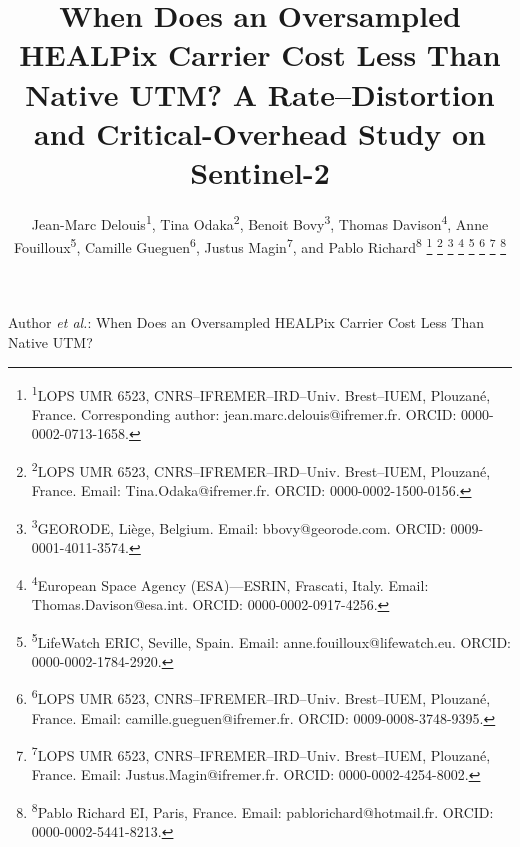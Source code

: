 \documentclass[journal]{IEEEtran}
\begin{document}

\title{When Does an Oversampled HEALPix Carrier Cost Less Than Native UTM? A Rate--Distortion and Critical-Overhead Study on Sentinel-2}

\author{
Jean-Marc Delouis\textsuperscript{1},
Tina Odaka\textsuperscript{2},
Benoit Bovy\textsuperscript{3},
Thomas Davison\textsuperscript{4},
Anne Fouilloux\textsuperscript{5},
Camille Gueguen\textsuperscript{6},
Justus Magin\textsuperscript{7},
and Pablo Richard\textsuperscript{8}%
\thanks{\textsuperscript{1}LOPS UMR 6523,
CNRS--IFREMER--IRD--Univ. Brest--IUEM, Plouzané, France.
Corresponding author: jean.marc.delouis@ifremer.fr. ORCID: 0000-0002-0713-1658.}%
\thanks{\textsuperscript{2}LOPS UMR 6523,
CNRS--IFREMER--IRD--Univ. Brest--IUEM, Plouzané, France.
Email: Tina.Odaka@ifremer.fr. ORCID: 0000-0002-1500-0156.}%
\thanks{\textsuperscript{3}GEORODE, Liège, Belgium.
Email: bbovy@georode.com. ORCID: 0009-0001-4011-3574.}%
\thanks{\textsuperscript{4}European Space Agency (ESA)---ESRIN, Frascati, Italy.
Email: Thomas.Davison@esa.int. ORCID: 0000-0002-0917-4256.}%
\thanks{\textsuperscript{5}LifeWatch ERIC, Seville, Spain.
Email: anne.fouilloux@lifewatch.eu. ORCID: 0000-0002-1784-2920.}%
\thanks{\textsuperscript{6}LOPS UMR 6523,
CNRS--IFREMER--IRD--Univ. Brest--IUEM, Plouzané, France.
Email: camille.gueguen@ifremer.fr. ORCID: 0009-0008-3748-9395.}%
\thanks{\textsuperscript{7}LOPS UMR 6523,
CNRS--IFREMER--IRD--Univ. Brest--IUEM, Plouzané, France.
Email: Justus.Magin@ifremer.fr. ORCID: 0000-0002-4254-8002.}%
\thanks{\textsuperscript{8}Pablo Richard EI, Paris, France.
Email: pablorichard@hotmail.fr. ORCID: 0000-0002-5441-8213.}%
}

%
{Author \MakeLowercase{\textit{et al.}}: When Does an Oversampled HEALPix Carrier Cost Less Than Native UTM?}

\maketitle
\end{document}
